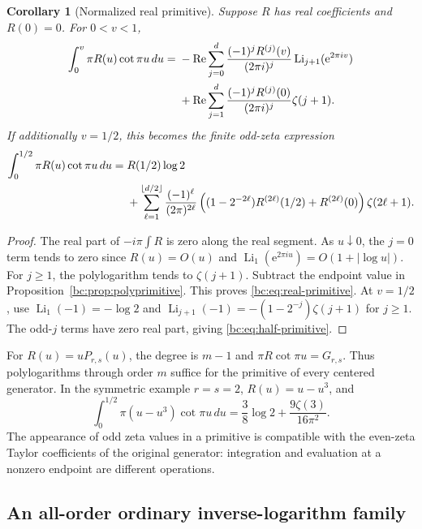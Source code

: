 \documentclass[11pt,letterpaper]{article}
\numberwithin{equation}{section}
\newtheorem{corollary}[theorem]{Corollary}
\theoremstyle{definition}
\theoremstyle{remark}
\newcommand{\bcLi}{\operatorname{Li}}
\newcommand{\bcRe}{\operatorname{Re}}
\newcommand{\bce}{\mathrm e}
\begin{document}
\begin{corollary}[Normalized real primitive]
\label{bc:cor:real-primitive}
Suppose $R$ has real coefficients and $R(0)=0$. For $0<v<1$,
\begin{align}
 \int_0^v\pi R(u)\cot\pi u\,du
 ={}&-\bcRe\sum_{j=0}^{d}
       \frac{(-1)^jR^{(j)}(v)}{(2\pi i)^j}
                           \bcLi_{j+1}(\bce^{2\pi i v})\notag\\
 &+\bcRe\sum_{j=1}^{d}
       \frac{(-1)^jR^{(j)}(0)}{(2\pi i)^j}\zeta(j+1).
 \label{bc:eq:real-primitive}
\end{align}
If additionally $v=1/2$, this becomes the finite odd-zeta expression
\begin{align}
 \int_0^{1/2}\pi R(u)\cot\pi u\,du
 ={}&R(1/2)\log2\notag\\
 &+\sum_{\ell=1}^{\lfloor d/2\rfloor}
   \frac{(-1)^\ell}{(2\pi)^{2\ell}}
   \left((1-2^{-2\ell})R^{(2\ell)}(1/2)+R^{(2\ell)}(0)\right)
                           \zeta(2\ell+1).
 \label{bc:eq:half-primitive}
\end{align}
\end{corollary}
\begin{proof}
The real part of $-i\pi\int R$ is zero along the real segment. As
$u\downarrow0$, the $j=0$ term tends to zero since
$R(u)=O(u)$ and $\bcLi_1(\bce^{2\pi i u})=O(1+|\log u|)$.
For $j\ge1$, the polylogarithm tends to $\zeta(j+1)$. Subtract the
endpoint value in Proposition~\ref{bc:prop:polyprimitive}. This proves
\eqref{bc:eq:real-primitive}. At $v=1/2$, use
$\bcLi_1(-1)=-\log2$ and
$\bcLi_{j+1}(-1)=-(1-2^{-j})\zeta(j+1)$ for $j\ge1$.
The odd-$j$ terms have zero real part, giving
\eqref{bc:eq:half-primitive}.
\end{proof}

For $R(u)=uP_{r,s}(u)$, the degree is $m-1$ and
$\pi R\cot\pi u=G_{r,s}$. Thus polylogarithms through order $m$ suffice
for the primitive of every centered generator. In the symmetric example
$r=s=2$, $R(u)=u-u^3$, and
\begin{equation}\label{bc:eq:primitive-22}
 \int_0^{1/2}\pi(u-u^3)\cot\pi u\,du
      =\frac38\log2+\frac{9\zeta(3)}{16\pi^2}.
\end{equation}
The appearance of odd zeta values in a primitive is compatible with the
even-zeta Taylor coefficients of the original generator: integration
and evaluation at a nonzero endpoint are different operations.

\subsection{An all-order ordinary inverse-logarithm family}
\end{document}
